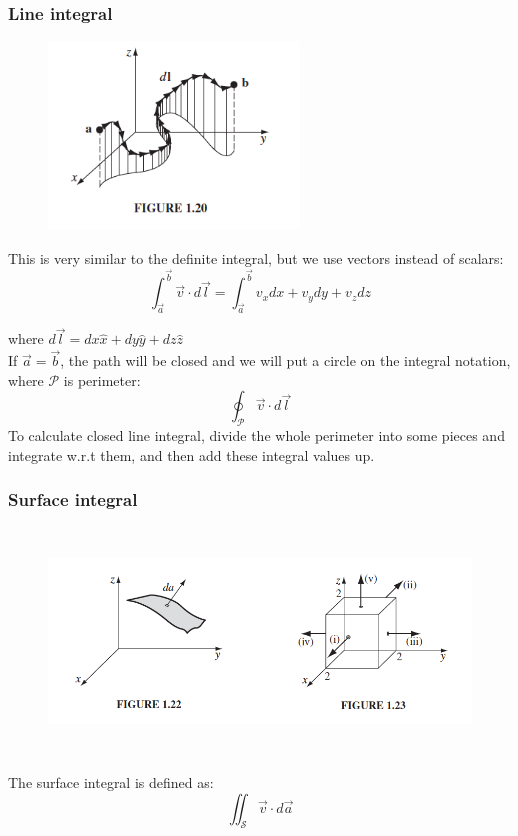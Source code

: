 \documentclass[12pt,a4paper,twoside]{article}
\numberwithin{equation}{section}
\begin{document}
	\subsubsection{Line integral}
	\begin{figure}[ht]
		\centering
		\includegraphics[height = 5cm]{lineintegral.png}
		\label{fig:1.20}
	\end{figure}
	\noindent This is very similar to the definite integral, but we use vectors instead of scalars:
	\begin{equation}
		\int_{\overrightarrow{a}}^{\overrightarrow{b}}\overrightarrow{v}\cdot d\overrightarrow{l}=\int_{\overrightarrow{a}}^{\overrightarrow{b}}v_xdx+v_ydy+v_zdz
	\end{equation}
	
	where \(d\overrightarrow{l}=dx\hat{x}+dy\hat{y}+dz\hat{z}\)\\
	
	\noindent If \(\overrightarrow{a}=\overrightarrow{b}\), the path will be closed and we will put a circle on the integral notation, where \(\mathcal{P}\) is perimeter:
	\[\oint_\mathcal{P}\overrightarrow{v}\cdot d\overrightarrow{l} \]
	To calculate closed line integral, divide the whole perimeter into some pieces and integrate w.r.t them, and then add these integral values up.
	
	\subsubsection{Surface integral}
	\begin{figure}[ht]
		\centering
		\includegraphics[height = 6cm]{surfaceintegral.png}
		\label{fig: 1.22/23}
	\end{figure}
	\noindent The surface integral is defined as:
	\begin{equation}
		\iint_\mathcal{S} \overrightarrow{v} \cdot d\overrightarrow{a}
	\end{equation}
	
\end{document}
